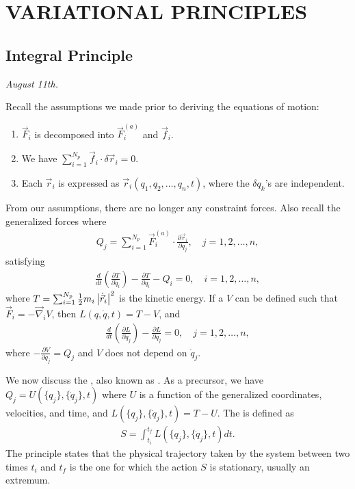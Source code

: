 \chapter{VARIATIONAL PRINCIPLES}

\section{Integral Principle}
\textit{August 11th.}

Recall the assumptions we made prior to deriving the equations of motion:
\begin{enumerate}
    \item $\vec{F}_{i}$ is decomposed into $\vec{F}_{i}^{(a)}$ and $\vec{f}_{i}$.
    \item We have $\sum_{i=1}^{N_{p}} \vec{f}_{i} \cdot \delta \vec{r}_{i} = 0$.
    \item Each $\vec{r}_{i}$ is expressed as $\vec{r}_{i}(q_{1},q_{2},\ldots,q_{n},t)$, where the $\delta q_{k}$'s are independent.
\end{enumerate}

From our assumptions, there are no longer any constraint forces. Also recall the generalized forces where
\begin{align}
    Q_{j} = \sum_{i=1}^{N_{p}} \vec{F}_{i}^{(a)} \cdot \frac{\partial \vec{r}_{i}}{\partial q_{j}}, \quad j = 1,2,\ldots,n,
\end{align}
satisfying
\begin{align}
    \frac{d}{dt} \left( \frac{\partial T}{\partial \dot{q}_{i}} \right) - \frac{\partial T}{\partial q_{i}} - Q_{i} = 0, \quad i = 1,2,\ldots,n,
\end{align}
where $T = \sum_{i=1}^{N_{p}} \frac{1}{2} m_{i} \left| \dot{\vec{r}}_{i} \right|^{2}$ is the kinetic energy. If a $V$ can be defined such that $\vec{F}_{i} = -\vec{\nabla}_{i} V$, then $L(q,\dot{q},t) = T - V$, and
\begin{align}
    \frac{d}{dt} \left( \frac{\partial L}{\partial \dot{q}_{j}} \right) - \frac{\partial L}{\partial q_{j}} = 0, \quad j = 1,2,\ldots,n,
\end{align}
where $-\frac{\partial V}{\partial q_{j}} = Q_{j}$ and $V$ does not depend on $\dot{q}_{j}$.

We now discuss the , also known as . As a precursor, we have $Q_{j} = U(\{q_{j}\},\{\dot{q}_{j}\},t)$ where $U$ is a function of the generalized coordinates, velocities, and time, and $L(\{q_{j}\},\{\dot{q}_{j}\},t) = T-U$. The  is defined as
\begin{align}
    S = \int_{t_{i}}^{t_{f}} L(\{q_{j}\},\{\dot{q}_{j}\},t)dt.
\end{align}
The principle states that the physical trajectory taken by the system between two times $t_{i}$ and $t_{f}$ is the one for which the action $S$ is stationary, usually an extremum.

